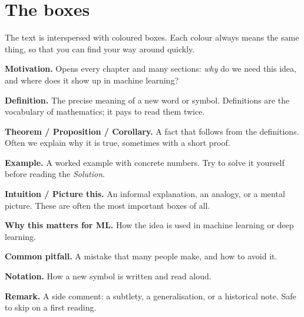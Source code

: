 \section*{The boxes}

The text is interspersed with coloured boxes. Each colour always means the
same thing, so that you can find your way around quickly.

\begin{tcolorbox}[mlbox=MLmotivation]
\textbf{\color{MLmotivation}Motivation.} Opens every chapter and many sections:
\emph{why} do we need this idea, and where does it show up in machine learning?
\end{tcolorbox}
\begin{tcolorbox}[mlbox=MLdef]
\textbf{\color{MLdef}Definition.} The precise meaning of a new word or symbol.
Definitions are the vocabulary of mathematics; it pays to read them twice.
\end{tcolorbox}
\begin{tcolorbox}[mlbox=MLthm]
\textbf{\color{MLthm}Theorem / Proposition / Corollary.} A fact that follows from
the definitions. Often we explain why it is true, sometimes with a short proof.
\end{tcolorbox}
\begin{tcolorbox}[mlbox=MLexample,colback=MLexample!3!white]
\textbf{\color{MLexample}Example.} A worked example with concrete numbers. Try to
solve it yourself before reading the \emph{Solution}.
\end{tcolorbox}
\begin{tcolorbox}[mlbox=MLintuition,colback=MLintuition!7!white]
\textbf{\color{MLintuition}Intuition / Picture this.} An informal explanation, an
analogy, or a mental picture. These are often the most important boxes of all.
\end{tcolorbox}
\begin{tcolorbox}[mlbox=MLml]
\textbf{\color{MLml}Why this matters for ML.} How the idea is used in machine
learning or deep learning.
\end{tcolorbox}
\begin{tcolorbox}[mlbox=MLpitfall]
\textbf{\color{MLpitfall}Common pitfall.} A mistake that many people make, and how
to avoid it.
\end{tcolorbox}
\begin{tcolorbox}[mlbox=MLnotation]
\textbf{\color{MLnotation}Notation.} How a new symbol is written and read aloud.
\end{tcolorbox}
\begin{tcolorbox}[mlbox=MLremark,colback=MLremark!4!white]
\textbf{\color{MLremark}Remark.} A side comment: a subtlety, a generalisation, or a
historical note. Safe to skip on a first reading.
\end{tcolorbox}
